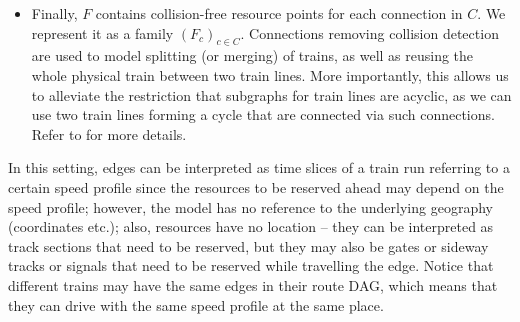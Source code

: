 \documentclass{article}
\begin{document}
\begin{itemize}
    \item Finally, $F$ contains collision-free resource points for each connection in $C$. We represent it as a family $(F_c)_{c\in C}$. Connections removing collision detection are used to model splitting (or merging) of trains, as well as reusing the whole physical train between two train lines. More importantly, this allows us to alleviate the restriction that subgraphs for train lines are acyclic, as we can use two train lines forming a cycle that are connected via such connections. Refer to \cite{DBLP:journals/corr/abs-2003-08598} for more details.
\end{itemize}
In this setting, edges can be interpreted as time slices of a train run referring to a certain speed profile since the resources to be reserved ahead may depend on the speed profile; however, the model has no reference to the underlying geography (coordinates etc.); also, resources have no location -- they can be interpreted as track sections that need to be reserved, but they may also be gates or sideway tracks or signals that need to be reserved while travelling the edge. Notice that different trains may have the same edges in their route DAG, which means that they can drive with the same speed profile at the same place.
\end{document}
